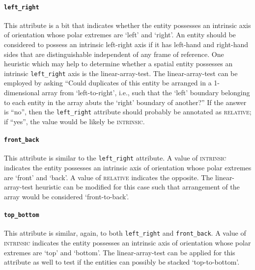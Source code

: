 \documentclass[11pt]{article}
\begin{document}
\paragraph{\texttt{left\_right}} %
\label{par:left_right}
This attribute is a bit that indicates whether the entity possesses an intrinsic axis of orientation whose polar extremes are `left' and `right'. An entity should be considered to possess an intrinsic left-right axis if it has left-hand and right-hand sides that are distinguishable independent of any frame of reference. One heuristic which may help to determine whether a spatial entity possesses an intrinsic \texttt{left\_right} axis is the linear-array-test. The linear-array-test can be employed by asking ``Could duplicates of this entity be arranged in a 1-dimensional array from `left-to-right', i.e., such that the `left' boundary belonging to each entity in the array abuts the `right' boundary of another?'' If the answer is ``no'', then the \texttt{left\_right} attribute should probably be annotated as \textsc{relative}; if ``yes'', the value would be likely be \textsc{intrinsic}.

\paragraph{\texttt{front\_back}} %
\label{par:front_back}
This attribute is similar to the \texttt{left\_right} attribute. A value of \textsc{intrinsic} indicates the entity possesses an intrinsic axis of orientation whose polar extremes are `front' and `back'. A value of \textsc{relative} indicates the opposite. The linear-array-test heuristic can be modified for this case such that arrangement of the array would be considered `front-to-back'.

\paragraph{\texttt{top\_bottom}} %
\label{par:top_bottom}
This attribute is similar, again, to both \texttt{left\_right} and \texttt{front\_back}. A value of \textsc{intrinsic} indicates the entity possesses an intrinsic axis of orientation whose polar extremes are `top' and `bottom'. The linear-array-test can be applied for this attribute as well to test if the entities can possibly be stacked `top-to-bottom'.
\end{document}

